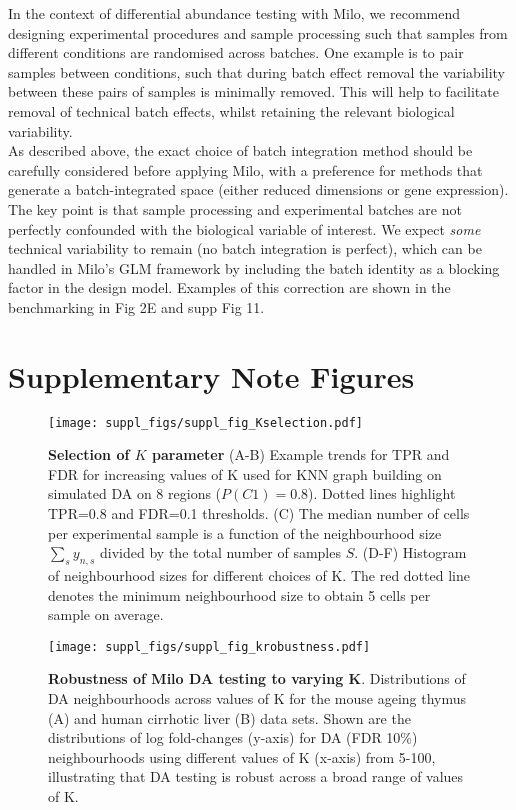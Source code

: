 \documentclass[
]{article}
\begin{document}
In the context of differential abundance testing with Milo, we recommend designing experimental procedures and sample processing such that samples from different
conditions are randomised across batches. One example is to pair samples between conditions, such that during batch effect removal the variability between these
pairs of samples is minimally removed. This will help to facilitate removal of technical batch effects, whilst retaining the relevant biological variability.\\
As described above, the exact choice of batch integration method should be carefully considered before applying Milo, with a preference for methods that generate
a batch-integrated space (either reduced dimensions or gene expression). The key point is that sample processing and experimental batches are not perfectly
confounded with the biological variable of interest. We expect \emph{some} technical variability to remain (no batch integration is perfect), which can be handled in
Milo's GLM framework by including the batch identity as a blocking factor in the design model. Examples of this correction are shown in the benchmarking in
Fig 2E and supp Fig 11.

\hypertarget{supplementary-note-figures}{%
\section{Supplementary Note Figures}\label{supplementary-note-figures}}

\renewcommand{\figurename}{Supplementary Note Figure}

\begin{figure}
\centering
\texttt{[image: suppl\_figs/suppl\_fig\_Kselection.pdf]}
\caption{\label{fig:sup-fig-Kselection}\textbf{Selection of \(K\) parameter}
(A-B) Example trends for TPR and FDR for increasing values of K used for KNN graph building on simulated DA on 8 regions (\(P(C1) = 0.8\)). Dotted lines highlight TPR=0.8 and FDR=0.1 thresholds. (C) The median number of cells per experimental sample is a function of the neighbourhood size \(\sum_s{y_{n,s}}\) divided by the total number of samples \(S\). (D-F) Histogram of neighbourhood sizes for different choices of K. The red dotted line denotes the minimum neighbourhood size to obtain 5 cells per sample on average.}
\end{figure}




\begin{figure}
\centering
\texttt{[image: suppl\_figs/suppl\_fig\_krobustness.pdf]}
\caption{\label{fig:sup-fig-robustness}\textbf{Robustness of Milo DA testing to varying K}. Distributions of DA neighbourhoods across values of K for the mouse ageing thymus (A) and human cirrhotic liver (B) data sets. Shown are the distributions of log fold-changes (y-axis) for DA (FDR 10\%) neighbourhoods using different values of K (x-axis) from 5-100, illustrating that DA testing is robust across a broad range of values of K.}
\end{figure}
\end{document}
